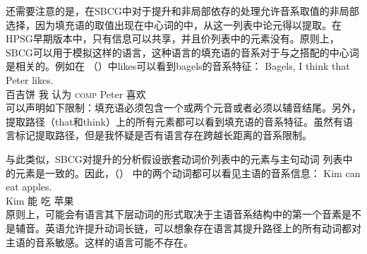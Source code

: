 还需要注意的是，在SBCG中对于提升和非局部依存的处理允许音系取值的非局部选择，因为填充语的\formvc 取值出现在中心词的\argstlc 中，从这一列表中论元得以提取。在HPSG早期版本中，只有\localc 信息可以共享，并且价列表中的元素没有\phonfc。原则上，SBCG可以用于模拟这样的语言，这种语言的填充语的音系对于与之搭配的中心词是相关的。例如在 （）中likes可以看到bagels的音系特征：
\ea
\gll Bagels, I think that Peter likes.\\
     百吉饼 我 认为 \textsc{comp} Peter 喜欢\\
\z
可以声明如下限制：填充语必须包含一个或两个元音或者必须以辅音结尾。另外，提取路径（that和think）上的所有元素都可以看到填充语的音系特征。虽然有语言标记提取路径，但是我怀疑是否有语言存在跨越长距离的音系限制。

与此类似，SBCG对提升的分析假设嵌套动词价列表中的元素与主句动词 \argstlc 列表中的元素是一致的\citep[]{Sag2012a}。因此，（） 中的两个动词都可以看见主语的音系信息：
\ea
\gll Kim can eat apples.\\
     Kim 能 吃 苹果\\
\z
原则上，可能会有语言其下层动词的形式取决于主语音系结构中的第一个音素是不是辅音。英语允许提升动词长链，可以想象存在语言其提升路径上的所有动词都对主语的音系敏感。这样的语言可能不存在。

